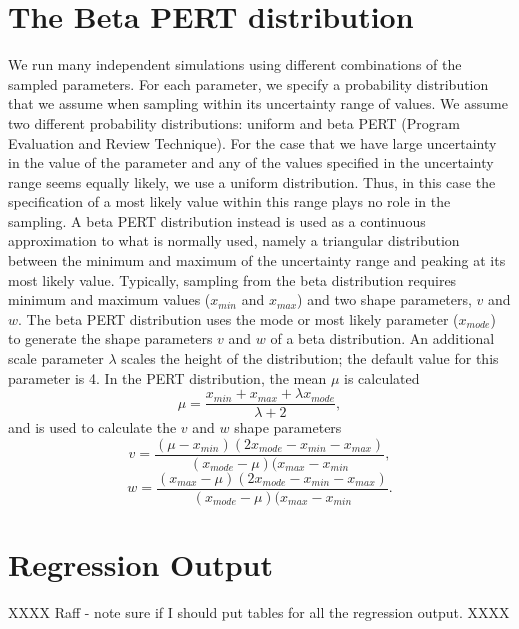 \documentclass[11pt]{nih_mod}
\begin{document}
\newpage


\appendix

\section{The Beta PERT distribution}
\label{sec:PERT}

We run many independent simulations using different combinations of the sampled parameters. For each parameter, we specify a probability distribution that we assume when sampling within its uncertainty range of values. We assume two different probability distributions: uniform and beta PERT (Program Evaluation and Review Technique). For the case that we have large uncertainty in the value of the parameter and any of the values specified in the uncertainty range seems equally likely, we use a uniform distribution. Thus, in this case the specification of a most likely value within this range plays no role in the sampling. A beta PERT distribution instead is used as a continuous approximation to what is normally used, namely a triangular distribution between the minimum and maximum of the uncertainty range and peaking at its most likely value. Typically, sampling from the beta distribution requires minimum and maximum values ($x_{min}$ and $x_{max}$) and two shape parameters, $v$ and $w$. The beta PERT distribution uses the mode or most likely parameter ($x_{mode}$) to generate the shape parameters $v$ and $w$ of a beta distribution. An additional scale parameter $\lambda$ scales the height of the distribution; the default value for this parameter is 4. In the PERT distribution, the mean $\mu$ is calculated
\begin{equation}
	\mu = \frac{x_{min}+x_{max}+\lambda x_{mode}}{\lambda+2},
\end{equation}
and is used to calculate the $v$ and $w$ shape parameters
\begin{equation}
	v = \frac{(\mu-x_{min})(2x_{mode}-x_{min}-x_{max})} {(x_{mode}-\mu)(x_{max}-x_{min}},
\end{equation}
\begin{equation}
	w = \frac{(x_{max}-\mu)(2x_{mode}-x_{min}-x_{max})}{(x_{mode}-\mu)(x_{max}-x_{min}}.
\end{equation} 

\section{Regression Output}
\label{sec:Regression}

XXXX Raff - note sure if I should put tables for all the regression output. XXXX
 
\pagebreak


\end{document}
